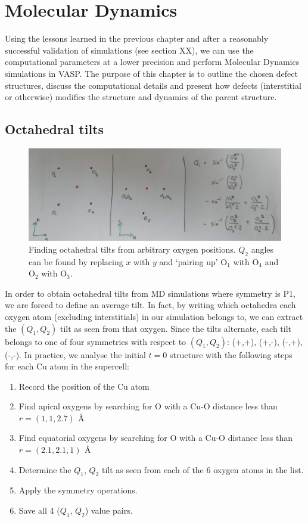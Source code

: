 \chapter{Molecular Dynamics}\label{ch:md}

Using the lessons learned in the previous chapter and after a reasonably successful validation of simulations (see section XX), we can use the computational parameters at a lower precision and perform Molecular Dynamics simulations in VASP. The purpose of this chapter is to outline the chosen defect structures, discuss the computational details and present how defects (interstitial or otherwise) modifies the structure and dynamics of the parent structure.

\section{Octahedral tilts}
\begin{figure}
	\centering
	\includegraphics[width=\textwidth]{fig/md/octahedral_tilts_md.jpg}
	\caption[Finding octahedral tilts from arbitrary oxygen positions]{Finding octahedral tilts from arbitrary oxygen positions. $Q_2$ angles can be found by replacing $x$ with $y$ and `pairing up' O$_1$ with O$_4$ and O$_2$ with O$_3$.}
	\label{fig:md_octahedral_tilts}
\end{figure}

In order to obtain octahedral tilts from MD simulations where symmetry is P1, we are forced to define an average tilt. In fact, by writing which octahedra each oxygen atom (excluding interstitials) in our simulation belongs to, we can extract the $(Q_1,Q_2)$ tilt as seen from that oxygen. Since the tilts alternate, each tilt belongs to one of four symmetries with respect to $(Q_1,Q_2)$: (+,+), (+,-), (-,+), (-,-). In practice, we analyse the initial $t=0$ structure with the following steps for each Cu atom in the supercell:

\begin{enumerate}
	\item Record the position of the Cu atom
	\item Find apical oxygens by searching for O with a Cu-O distance less than $r = (1,1,2.7) \, \SI{}{\angstrom}$
	\item Find equatorial oxygens by searching for O with a Cu-O distance less than $r = (2.1,2.1,1) \, \SI{}{\angstrom}$
	\item Determine the $Q_1$, $Q_2$ tilt as seen from each of the 6 oxygen atoms in the list.
	\item Apply the symmetry operations.
	\item Save all 4 ($Q_1$, $Q_2$) value pairs.
\end{enumerate}

